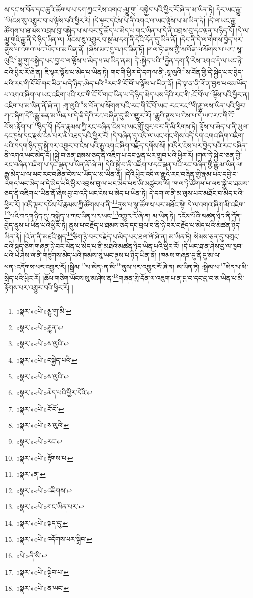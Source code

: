 ས་དང་ས་བོན་དང་ཆུའི་ཚོགས་པ་དག་ཀྱང་རེས་འགའ་:མྱུ་གུ་\footnote{«སྣར་»«པེ་»མྱུ་གུ་མི་}བསྐྱེད་པའི་ཕྱིར་རོ་ཞེ་ན་མ་ཡིན་ཏེ། དེར་ཡང་རྒྱུ་\footnote{«སྣར་»«པེ་»རྒྱུན་}ཡོངས་སུ་འགྱུར་བ་ལ་ལྟོས་པའི་ཕྱིར་རོ། །དེ་ལྟར་དངོས་པོ་ནི་འགའ་ལ་ཡང་ལྟོས་པ་མ་ཡིན་ནོ། །དེ་ལ་ཡང་རྒྱུ་ཚོགས་པ་ཐ་མས་འབྲས་བུ་བསྐྱེད་པ་ལ་བར་དུ་ཆོད་པ་མེད་པ་གང་ཡིན་པ་དེ་ནི་འབྲས་བུ་དང་ལྡན་པ་ཉིད་དོ། །དེ་ལ་མྱུ་གུའི་རྒྱུ་ནི་དེ་ཉིད་ཡིན་ལ། ཡོངས་སུ་འགྱུར་བ་སྔ་མ་དག་ནི་དེའི་དོན་དུ་ཡིན་ནོ། །དེར་ནི་དེ་ལ་གེགས་བྱེད་པར་ནུས་པ་འགའ་ཡང་ཡོད་པ་མ་ཡིན་ནོ། །ཞེས་མང་དུ་བཤད་ཟིན་ཏོ། །གལ་ཏེ་ནས་ཀྱི་ས་བོན་ལ་སོགས་པ་ཡང་:སཱ་ལུའི་\footnote{«སྣར་»«པེ་»ས་ལུའི་}མྱུ་གུ་བསྐྱེད་པར་བྱ་བ་ལ་ལྟོས་པ་མེད་པ་མ་ཡིན་ནམ། དེ་:སྐྱེད་པའི་\footnote{«སྣར་»«པེ་»བསྐྱེད་པའི་}རྐྱེན་དག་ནི་རེས་འགའ་དེ་ལ་ཡང་ཉེ་བའི་ཕྱིར་རོ་ཞེ་ན། ཇི་ལྟར་ལྟོས་པ་མེད་པ་ཡིན་ཏེ། གང་གི་ཕྱིར་དེ་དག་ལ་ནི་:སཱ་ལུའི་\footnote{«སྣར་»«པེ་»ས་ལུའི་}ས་བོན་གྱི་དེ་སྐྱེད་པར་བྱེད་པའི་རང་གི་ངོ་བོ་གང་ཡིན་པ་དེ་ཉིད་:མེད་པའི་\footnote{«སྣར་»«པེ་»མེད་པའི་ཕྱིར་དེའི་}རང་གི་ངོ་བོ་ལ་ལྟོས་པ་ཡིན་ནོ། །དེ་ལྟ་ན་ནི་འོ་ན་བྱས་པའམ་ཡོད་པ་འགའ་ཞིག་ལ་ཡང་འཇིག་པའི་རང་གི་ངོ་བོ་གང་ཡིན་པ་དེ་ཉིད་མེད་པས་དེའི་རང་གི་:ངོ་བོ་ལ་\footnote{«སྣར་»«པེ་»ངོ་བོ་}ལྟོས་པའི་ཕྱིར་ན། འཇིག་པ་མ་ཡིན་ནོ་ཞེ་ན། :སཱ་ལུའི་\footnote{«སྣར་»«པེ་»ས་ལུའི་}ས་བོན་ལ་སོགས་པའི་རང་གི་ངོ་བོ་ཡང་:རང་རང་\footnote{«སྣར་»«པེ་»རང་}གི་རྒྱུ་ལས་ཡིན་པའི་ཕྱིར། གང་ཞིག་དེའི་རྒྱུ་ཅན་མ་ཡིན་པ་དེ་ནི་དེའི་རང་བཞིན་དུ་མི་འགྱུར་རོ། །རྒྱུའི་ནུས་པ་ངེས་པ་དེ་ཡང་རང་གི་ངོ་བོས་:རྟོག་པ་\footnote{«སྣར་»«པེ་»རྟོགས་པ་}ཉིད་དོ། །དོན་རྣམས་ཀྱི་རང་བཞིན་ངེས་པ་ཡང་གློ་བུར་བར་ནི་མི་རིགས་ཏེ། ལྟོས་པ་མེད་པ་ནི་ཡུལ་དང་དུས་དང་རྫས་ངེས་པར་མི་འཐད་པའི་ཕྱིར་རོ། །དེ་བཞིན་དུ་འདི་ལ་ཡང་གང་གིས་འདི་དག་འགའ་ཞིག་འཇིག་པའི་བདག་ཉིད་དུ་སྐྱེ་བར་འགྱུར་བ་ངེས་པའི་རྒྱུ་འགའ་ཞིག་བརྗོད་དགོས་སོ། །འདིར་ངེས་པར་བྱེད་པའི་རང་བཞིན་ནི་འགའ་ཡང་མེད་དོ། །སྐྱེ་བ་ཅན་ཐམས་ཅད་ནི་འཇིག་པ་དང་ལྡན་པར་གྲུབ་པའི་ཕྱིར་རོ། །གལ་ཏེ་སྐྱེ་བ་ཅན་གྱི་རང་བཞིན་འཇིག་པ་དང་ལྡན་པ་ཡིན་ནོ་ཞེ་ན། དེའི་སྐྱེ་བ་ནི་འཇིག་པ་དང་ལྡན་པའི་རང་བཞིན་གྱི་རྒྱུ་མ་ཡིན་ལ། རྒྱུ་མེད་པ་ལ་ཡང་རང་བཞིན་ངེས་པ་ཡོད་པ་མ་ཡིན་ནོ། །དེའི་ཕྱིར་འདི་ལ་རྒྱུའི་རང་བཞིན་གྱི་རྣམ་པར་དབྱེ་བ་འགའ་ཡང་མེད་ལ་དེ་མེད་པའི་ཕྱིར་འབྲས་བུ་ལ་ཡང་མེད་པས་མི་མཚུངས་སོ། །གལ་ཏེ་ཚོགས་པ་ལས་སྐྱེ་བ་ཐམས་ཅད་ནི་འཇིག་པ་ཡིན་ནོ་ཞེས་བྱ་བ་འདི་ཡང་ངེས་པ་མེད་པ་ཡིན་ཏེ། དེ་དག་ལ་ནི་མ་ལུས་པར་མཐོང་བ་མེད་པའི་ཕྱིར་རོ། །འདི་ལྟར་དངོས་པོ་རྣམས་ཀྱི་ཚོགས་པ་ནི་\footnote{«སྣར་»ན་}ནུས་པ་སྣ་ཚོགས་པར་མཐོང་སྟེ། དེ་ལ་འགའ་ཞིག་མི་འཇིག་\footnote{«སྣར་»«པེ་»འཇིགས་}པའི་བདག་ཉིད་དུ་:བསྐྱེད་པ་གང་ཡིན་པར་ཡང་\footnote{«སྣར་»«པེ་»གང་ཡིན་པར་}འགྱུར་རོ་ཞེ་ན། མ་ཡིན་ཏེ། དངོས་པོའི་མཚན་ཉིད་ནི་དོན་བྱེད་ནུས་པ་ཡིན་པའི་ཕྱིར་ཏེ། ནུས་པ་བརྗོད་པ་ཐམས་ཅད་དང་བྲལ་བ་ནི་ཉེ་བར་བརྗོད་པ་མེད་པའི་མཚན་ཉིད་ཡིན་ནོ། །འོ་ན་ནི་མཐའི་སྐད་\footnote{«སྣར་»«པེ་»སྐད་དུ་}ཅིག་ཉེ་བར་བརྗོད་པ་མེད་པར་ཐལ་ལོ་ཞེ་ན། མ་ཡིན་ཏེ། སེམས་ཅན་དུ་བགྲང་བའི་སྐད་ཅིག་གཞན་ཉེ་བར་ལེན་པ་མེད་པ་ནི་མཐའི་མཚན་ཉིད་ཡིན་པའི་ཕྱིར་རོ། །དེ་ཡང་ཐ་ན་ཤེས་བྱ་ལ་ཁྱབ་པའི་ཡེ་ཤེས་ལ་ནི་གཟུགས་མེད་པའི་ཁམས་སུ་ཡང་ནུས་པ་ཉིད་ཡིན་ནོ། །ཁམས་གཞན་དུ་ནི་དུ་མ་ལ་ཕན་:འདོགས་པར་འགྱུར་རོ། །སྒྲིམ་\footnote{«སྣར་»«པེ་»འདོགས་པར་སྒྲིབ་}པ་མེད་:ན་མི་\footnote{«པེ་»ནི་སི་}ནུས་པར་འགྱུར་རོ་ཞེ་ན། མ་ཡིན་ཏེ། :སྒྲིམ་པ་\footnote{«སྣར་»«པེ་»སྒྲིབ་པ་}མེད་པ་མི་སྲིད་པའི་ཕྱིར་རོ། །ཆོས་གཅིག་ཡོངས་སུ་མ་ཤེས་ན་\footnote{«སྣར་»«པེ་»ན་ཡང་}གཞན་གྱི་དོན་ལ་འཇུག་པ་ན་བྱ་བ་དང་བྱ་བ་མ་ཡིན་པ་མི་རྟོགས་པར་འགྱུར་བའི་ཕྱིར་རོ། །

